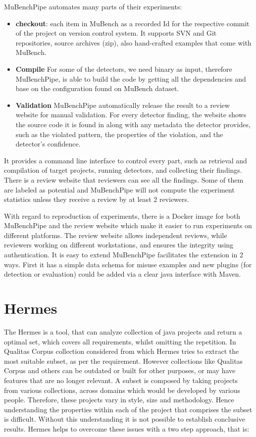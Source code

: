 \documentclass[authoryear,preprint]{sigplanconf}
\begin{document}
MuBenchPipe automates many parts of their experiments:
\begin{itemize}
	\item \textbf{checkout}: each item in MuBench as a recorded Id for the respective commit of the project on version control system. It supports SVN and Git repositories, source archives (zip), also hand-crafted examples that come with MuBench.
	\item \textbf{Compile} For some of the detectors, we need binary as input, therefore MuBenchPipe, is able to build the code by getting all the dependencies and base on the configuration found on MuBench dataset. 
	\item \textbf{Validation} MuBenchPipe automatically release the result to a review website for manual validation. For every detector finding, the website shows the source code it is found in along with any metadata the detector provides, such as the violated pattern, the properties of the violation, and the detector’s confidence\cite{8338426}.
\end{itemize}

It provides a command line interface to control every part, such as retrieval and compilation of target projects, running detectors, and collecting their findings. There is a review website that reviewers can see all the findings. Some of them are labeled as potential and MuBenchPipe will not compute the experiment statistics unless they receive a review by at least 2 reviewers. 

With regard to reproduction of experiments, there is a Docker image for both MuBenchPipe and the review website which make it easier to run experiments on different platforms. The review website allows independent reviews, while reviewers working on different workstations, and ensures the integrity using authentication. It is easy to extend MuBenchPipe facilitates the extension in 2 ways. First it has a simple data schema for misuse examples and new plugins (for detection or evaluation) could be added via a clear java interface with Maven. 

\section{Hermes}
\label{sec:sec_hermes}
The Hermes\cite{Reif:2017:HAC:3088515.3088523} is a tool, that can analyze collection of java projects and return a optimal set, which covers all requirements, whilst omitting the repetition. In Qualitas Corpus\cite{5693210} \cite{Dingsoyr:2013:RCL:2507288.2507322} collection considered from which Hermes tries to extract the most suitable subset, as per the requirement. However collections like Qualitas Corpus and others can be outdated or built for other purposes, or may have features that are no longer relevant. A subset is composed by taking projects from various collections, across domains which would be developed by various people. Therefore, these projects vary in style, size and methodology. Hence understanding the properties within each of the project that comprises the subset is difficult. Without this understanding it is not possible to establish conclusive results. Hermes helps to overcome these issues with a two step approach, that is:
\end{document}

